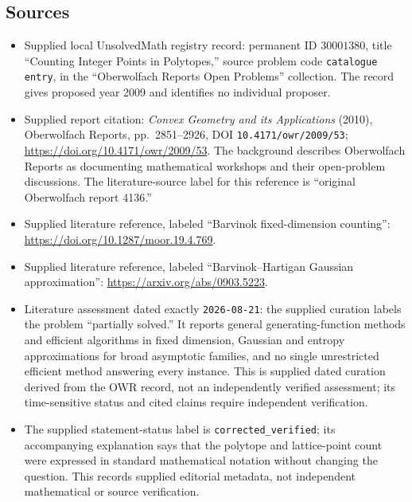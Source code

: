 \documentclass[11pt]{article}
\begin{document}
\subsection{Sources}
\begin{itemize}
\item Supplied local UnsolvedMath registry record: permanent ID \(30001380\), title ``Counting Integer Points in Polytopes,'' source problem code \texttt{catalogue entry}, in the ``Oberwolfach Reports Open Problems'' collection. The record gives proposed year 2009 and identifies no individual proposer.
\item Supplied report citation: \emph{Convex Geometry and its Applications} (2010), Oberwolfach Reports, pp.~2851--2926, DOI \texttt{10.4171/owr/2009/53}; \url{https://doi.org/10.4171/owr/2009/53}. The background describes Oberwolfach Reports as documenting mathematical workshops and their open-problem discussions. The literature-source label for this reference is ``original Oberwolfach report 4136.''
\item Supplied literature reference, labeled ``Barvinok fixed-dimension counting'': \url{https://doi.org/10.1287/moor.19.4.769}.
\item Supplied literature reference, labeled ``Barvinok--Hartigan Gaussian approximation'': \url{https://arxiv.org/abs/0903.5223}.
\item Literature assessment dated exactly \texttt{2026-08-21}: the supplied curation labels the problem ``partially solved.'' It reports general generating-function methods and efficient algorithms in fixed dimension, Gaussian and entropy approximations for broad asymptotic families, and no single unrestricted efficient method answering every instance. This is supplied dated curation derived from the OWR record, not an independently verified assessment; its time-sensitive status and cited claims require independent verification.
\item The supplied statement-status label is \texttt{corrected\_verified}; its accompanying explanation says that the polytope and lattice-point count were expressed in standard mathematical notation without changing the question. This records supplied editorial metadata, not independent mathematical or source verification.
\end{itemize}
\end{document}
